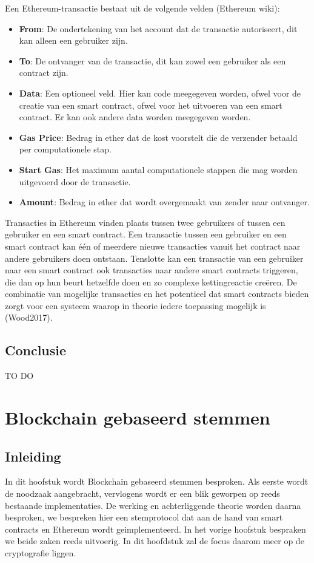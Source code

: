 		Een Ethereum-transactie bestaat uit de volgende velden (Ethereum wiki):
		\begin{itemize}
			\item \textbf{From}: De ondertekening van het account dat de transactie autoriseert, dit kan alleen een gebruiker zijn.
			\item \textbf{To}: De ontvanger van de transactie, dit kan zowel een gebruiker als een contract zijn. 
			\item \textbf{Data}: Een optioneel veld. Hier  kan code meegegeven worden, ofwel voor de creatie van een smart contract, ofwel voor het uitvoeren van een smart contract.
Er kan ook andere data worden meegegeven worden.
			\item \textbf{Gas Price}: Bedrag in ether dat de kost voorstelt die de verzender betaald per computationele stap.
			\item \textbf{Start Gas}: Het maximum aantal computationele stappen die mag worden uitgevoerd door de transactie.
			\item \textbf{Amount}: Bedrag in ether dat wordt overgemaakt van zender naar ontvanger.
		\end{itemize}	
		Transacties in Ethereum vinden plaats tussen twee gebruikers of tussen een gebruiker en een smart contract. Een transactie tussen een gebruiker en een smart contract kan één of meerdere nieuwe transacties vanuit het contract naar andere gebruikers doen ontstaan. Tenslotte kan een transactie van een gebruiker naar een smart contract ook transacties naar andere smart contracts triggeren, die dan op hun beurt hetzelfde doen en zo complexe kettingreactie creëren. De combinatie van mogelijke transacties en het potentieel dat smart contracts bieden zorgt voor een systeem waarop in theorie iedere toepassing mogelijk is (Wood2017). 
	\subsection{Conclusie}
		TO DO
\section{Blockchain gebaseerd stemmen}
\label{sec:blockchain-gebaseerd-stemmen}
	\subsection*{Inleiding}
			In dit hoofstuk wordt Blockchain gebaseerd stemmen besproken. Als eerste wordt de noodzaak aangebracht, vervlogens wordt er een blik geworpen op reeds  bestaande implementaties. De werking en achterliggende theorie worden daarna besproken, we bespreken hier een stemprotocol dat  aan de hand van smart contracts en Ethereum wordt geimplementeerd. In het vorige hoofstuk bespraken we beide zaken reeds uitvoerig. In dit hoofdstuk zal de focus daarom meer op de cryptografie liggen.
